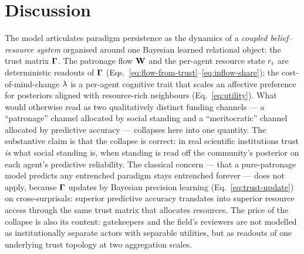 \section{Discussion}
\label{sec:discussion}

The model articulates paradigm persistence as the dynamics of a
\emph{coupled belief--resource system} organised around one Bayesian
learned relational object: the trust matrix $\boldsymbol{\Gamma}$. The patronage
flow $\mathbf{W}$ and the per-agent resource state $r_{i}$ are
deterministic readouts of $\boldsymbol{\Gamma}$
(Eqs.~\ref{eq:flow-from-trust}--\ref{eq:inflow-share}); the
cost-of-mind-change $\lambda$ is a per-agent cognitive trait that scales
an affective preference for posteriors aligned with resource-rich
neighbours (Eq.~\ref{eq:utility}). What would otherwise read as two
qualitatively distinct funding channels --- a ``patronage'' channel
allocated by social standing and a ``meritocratic'' channel allocated
by predictive accuracy --- collapses here into one quantity. The
substantive claim is that the collapse is correct: in real scientific
institutions trust \emph{is} what social standing is, when standing is
read off the community's posterior on each agent's predictive
reliability. The classical concern --- that a pure-patronage model
predicts any entrenched paradigm stays entrenched forever --- does not
apply, because $\boldsymbol{\Gamma}$ updates by Bayesian precision learning
(Eq.~\ref{eq:trust-update}) on cross-surprisals: superior predictive
accuracy translates into superior resource access through the same
trust matrix that allocates resources. The price of the collapse is
also its content: gatekeepers and the field's reviewers are not
modelled as institutionally separate actors with separable utilities,
but as readouts of one underlying trust topology at two aggregation
scales.

